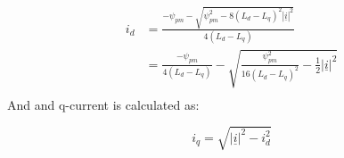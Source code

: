 \documentclass[]{book}
\begin{document}
\[
\begin{aligned}
i_d &= \frac{-\psi_{pm} - \sqrt{\psi_{pm}^2 - 8 (L_d-L_q)^2 |\underline{i}|^2}}{4 (L_d-L_q)} \\
&= \frac{-\psi_{pm} }{4 (L_d-L_q)} -   \sqrt{\frac{\psi_{pm}^2}{16 (L_d-L_q)^2} - \frac{1}{2} |\underline{i}|^2}\\
\end{aligned}
\label{eq:mtpa5}
\]
And and q-current is calculated as:

\[
i_q = \sqrt{|\underline{i}|^2 - i^2_d }
\label{eq:mtpa6}
\]


\end{document}
